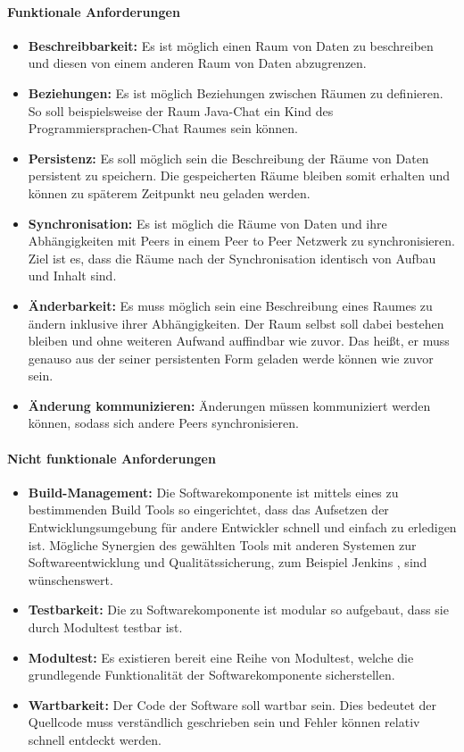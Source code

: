 \documentclass[a4paper]{article}
\begin{document}
	\paragraph{Funktionale Anforderungen}
	\begin{itemize}
		\item \textbf{Beschreibbarkeit:} Es ist möglich einen Raum von
		Daten zu beschreiben und diesen von einem anderen Raum
		von Daten abzugrenzen. 
		\item \textbf{Beziehungen:} Es ist möglich Beziehungen zwischen
		Räumen zu definieren. So soll beispielsweise der Raum Java-Chat ein 
		Kind des Programmiersprachen-Chat Raumes sein können.
		\item \textbf{Persistenz:} Es soll möglich sein die Beschreibung der
		Räume von Daten persistent zu speichern. Die gespeicherten Räume
		bleiben somit erhalten und können zu späterem Zeitpunkt neu
		geladen werden.
		\item \textbf{Synchronisation:} Es ist möglich die Räume von Daten 
		und ihre Abhängigkeiten mit Peers in einem Peer to Peer Netzwerk 
		zu synchronisieren. Ziel ist es, dass die Räume nach der 
		Synchronisation identisch von Aufbau und Inhalt sind.
		\item \textbf{Änderbarkeit:} Es muss möglich sein eine Beschreibung
		eines Raumes zu ändern inklusive ihrer Abhängigkeiten. Der Raum
		selbst soll dabei bestehen bleiben und ohne weiteren Aufwand auffindbar 
		wie	zuvor. Das heißt, er muss genauso aus der seiner persistenten Form 
		geladen werde können wie zuvor sein.
		\item \textbf{Änderung kommunizieren:} Änderungen müssen
		kommuniziert werden können, sodass sich andere Peers synchronisieren.
	\end{itemize} 	
	
	\paragraph{Nicht funktionale Anforderungen}
	\begin{itemize}
		\item \textbf{Build-Management:} Die Softwarekomponente ist mittels
		eines zu bestimmenden Build Tools so eingerichtet, dass das Aufsetzen 
		der	Entwicklungsumgebung für andere Entwickler schnell und einfach
		zu erledigen ist. Mögliche Synergien des gewählten Tools mit anderen
		Systemen zur Softwareentwicklung und Qualitätssicherung, zum Beispiel  
		Jenkins \cite{Jenkins}, sind wünschenswert.
		\item \textbf{Testbarkeit:} Die zu Softwarekomponente
		ist modular so aufgebaut, dass sie durch Modultest testbar ist.
		\item \textbf{Modultest:} Es existieren bereit eine Reihe von
		Modultest, welche die grundlegende Funktionalität der 
		Softwarekomponente sicherstellen.
		\item \textbf{Wartbarkeit:} Der Code der Software soll wartbar sein.
		Dies bedeutet der Quellcode muss verständlich geschrieben sein und Fehler
		können relativ schnell entdeckt werden.
	\end{itemize} 
	
\end{document}
